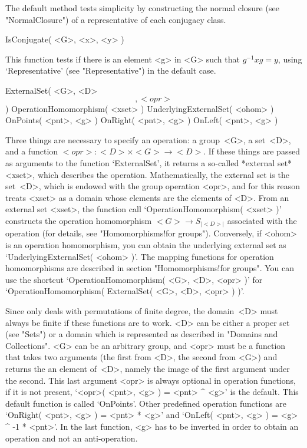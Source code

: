 The default method  tests simplicity by  constructing the  normal closure
(see "NormalClosure") of a representative of each conjugacy class.

\>IsConjugate( <G>, <x>, <y> )

This function tests   if  there is an  element    <g> in <G>   such  that
$g^{-1}xg=y$,  using  `Representative'  (see  "Representative")   in  the
default case.

\null

\>ExternalSet( <G>, <D> \[, <opr> \] )
%
\>OperationHomomorphism( <xset> )
%
\>UnderlyingExternalSet( <ohom> )
\>OnPoints( <pnt>, <g> )
\>OnRight( <pnt>, <g> )
\>OnLeft( <pnt>, <g> )

Three   things are  necessary  to  specify  an operation:  a group~<G>, a
set~<D>, and a  function  $<opr>\colon <D>\times  <G>\to <D>$.  If  these
things are passed as arguments to the  function `ExternalSet', it returns
a    so-called  *external set*  <xset>,  which   describes the operation.
Mathematically,  the external set  is the set~<D>,  which is endowed with
the group operation <opr>, and for this reason  {\GAP} treats <xset> as a
domain whose  elements are  the  elements  of <D>.  From an  external set
<xset>, the function  call  `OperationHomomorphism( <xset> )'  constructs
the   operation  homomorphism $<G>  \to  S_{|<D>|}$   associated with the
operation (for details, see  "Homomorphisms!for groups").  Conversely, if
<ohom>  is an   operation homomorphism,  you  can  obtain the  underlying
external set as `UnderlyingExternalSet( <ohom>  )'. The mapping functions
for operation homomorphisms  are described in  section "Homomorphisms!for
groups". You can use the shortcut `OperationHomomorphism( <G>, <D>, <opr>
)' for `OperationHomomorphism( ExternalSet( <G>, <D>, <opr> ) )'.

Since  {\GAP}   only deals  with permutations     of  finite degree,  the
domain~<D> must always be finite if these  functions are to work. <D> can
be either a proper set (see  "Sets") or a  domain which is represented as
described in "Domains  and Collections". <G>  can be an  arbitrary group,
and <opr> must be a  {\GAP} function that  takes two arguments (the first
from <D>, the second from <G>) and returns the  an element of~<D>, namely
the image of the   first argument under  the  second. This last  argument
<opr> is always  optional in operation functions, if  it  is not present,
`<opr>( <pnt>, <g> ) = <pnt> ^ <g>' is the default. This default function
is called `OnPoints'. Other predefined  operation functions are `OnRight(
<pnt>, <g> ) =  <pnt> * <g>'  and `OnLeft(  <pnt>,  <g> ) =   <g> ^ -1  *
<pnt>'. In the last function,  <g> has to be inverted  in order to obtain
an operation and not an anti-operation.

